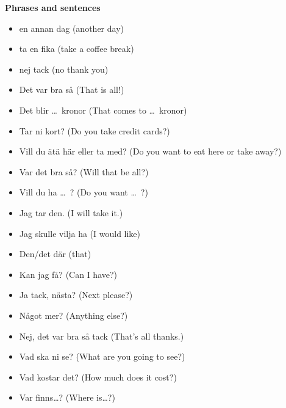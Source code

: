 
\begin{flushleft}
    \textbf{Phrases and sentences}
    \begin{itemize}
        \item en annan dag (another day)
        \item ta en fika (take a coffee break)
        \item nej tack (no thank you)
        \item Det var bra så (That is all!)
        \item Det blir \ldots\ kronor (That comes to \ldots\ kronor)
        \item Tar ni kort? (Do you take credit cards?)
        \item Vill du ätä här eller ta med? (Do you want to eat here or take away?)
        \item Var det bra så? (Will that be all?)
        \item Vill du ha \ldots\ ? (Do you want \ldots\ ?)
        \item Jag tar den. (I will take it.)
        \item Jag skulle vilja ha (I would like)
        \item Den/det där (that)
        \item Kan jag få? (Can I have?)
        \item Ja tack, nästa? (Next please?)
        \item Något mer? (Anything else?)
        \item Nej, det var bra så tack (That's all thanks.)
        \item Vad ska ni se? (What are you going to see?)
        \item Vad kostar det? (How much does it cost?)
        \item Var finns\ldots? (Where is\ldots?)
    \end{itemize}
\end{flushleft}

